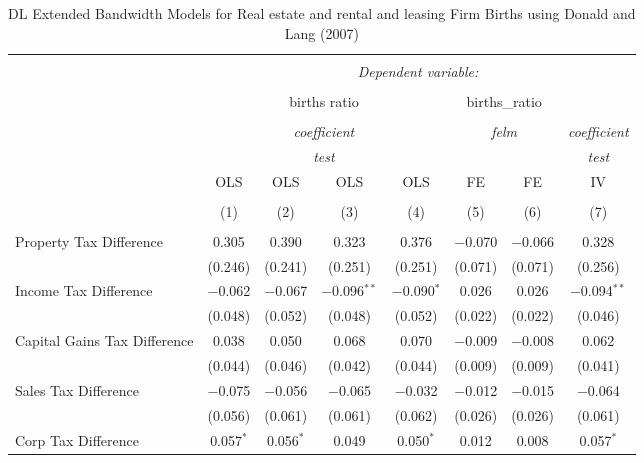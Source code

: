 
\begin{table}[!htbp] \centering 
  \caption{DL Extended Bandwidth Models for  Real estate and rental and leasing Firm Births using Donald and Lang (2007)} 
  \label{} 
\begin{tabular}{@{\extracolsep{5pt}}lccccccc} 
\\[-1.8ex]\hline 
\hline \\[-1.8ex] 
 & \multicolumn{7}{c}{\textit{Dependent variable:}} \\ 
\cline{2-8} 
\\[-1.8ex] & \multicolumn{4}{c}{births ratio} & \multicolumn{2}{c}{births\_ratio} &   \\ 
\\[-1.8ex] & \multicolumn{4}{c}{\textit{coefficient}} & \multicolumn{2}{c}{\textit{felm}} & \textit{coefficient} \\ 
 & \multicolumn{4}{c}{\textit{test}} & \multicolumn{2}{c}{\textit{}} & \textit{test} \\ 
 & OLS & OLS & OLS & OLS & FE & FE & IV \\ 
\\[-1.8ex] & (1) & (2) & (3) & (4) & (5) & (6) & (7)\\ 
\hline \\[-1.8ex] 
 Property Tax Difference & 0.305 & 0.390 & 0.323 & 0.376 & $-$0.070 & $-$0.066 & 0.328 \\ 
  & (0.246) & (0.241) & (0.251) & (0.251) & (0.071) & (0.071) & (0.256) \\ 
  Income Tax Difference & $-$0.062 & $-$0.067 & $-$0.096$^{**}$ & $-$0.090$^{*}$ & 0.026 & 0.026 & $-$0.094$^{**}$ \\ 
  & (0.048) & (0.052) & (0.048) & (0.052) & (0.022) & (0.022) & (0.046) \\ 
  Capital Gains Tax Difference & 0.038 & 0.050 & 0.068 & 0.070 & $-$0.009 & $-$0.008 & 0.062 \\ 
  & (0.044) & (0.046) & (0.042) & (0.044) & (0.009) & (0.009) & (0.041) \\ 
  Sales Tax Difference & $-$0.075 & $-$0.056 & $-$0.065 & $-$0.032 & $-$0.012 & $-$0.015 & $-$0.064 \\ 
  & (0.056) & (0.061) & (0.061) & (0.062) & (0.026) & (0.026) & (0.061) \\ 
  Corp Tax Difference & 0.057$^{*}$ & 0.056$^{*}$ & 0.049 & 0.050$^{*}$ & 0.012 & 0.008 & 0.057$^{*}$ \\ 

\end{tabular}
\end{table}
